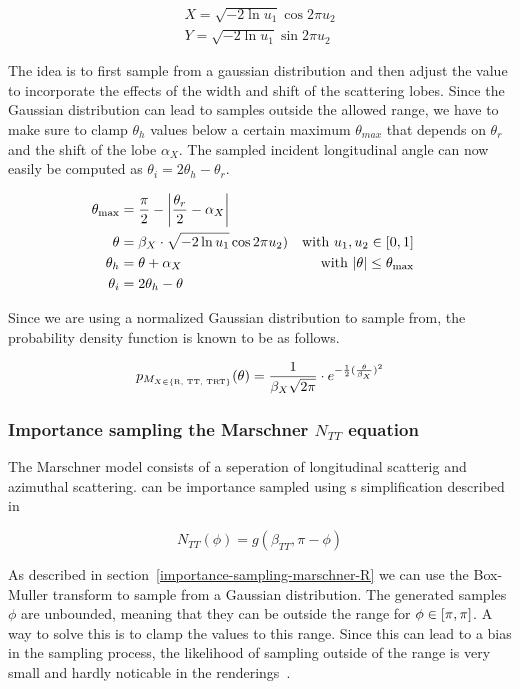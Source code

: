 \documentclass[12pt,a4paper,twoside]{article}
\begin{document}
\begin{eqnarray}
X = \sqrt{-2 \ln u_1} \cos 2\pi u_2 \\
Y = \sqrt{-2 \ln u_1} \sin 2\pi u_2 
\end{eqnarray}

The idea is to first sample from a gaussian distribution and then adjust the value to incorporate the effects of the width and shift of the scattering lobes. Since the Gaussian distribution can lead to samples outside the allowed range, we have to make sure to clamp $\theta_h$ values below a certain maximum $\theta_{max}$ that depends on $\theta_r$ and the shift of the lobe $\alpha_X$. The sampled incident longitudinal angle can now easily be computed as $\theta_i = 2\theta_h - \theta_r$.

\begin{align}
\theta_{\textnormal{max}} & = \frac{\pi}{2} - \left| \frac{\theta_r}{2} - \alpha_X\right| \\
\theta & = \beta_{X} \cdot \sqrt{-2 \ln u_1} \cos 2\pi u_2) & \textnormal{with $u_1, u_2 \in [0, 1]$}  \\
\theta_h & = \theta + \alpha_X & \textnormal{with $\left|\theta\right| \leq \theta_{\textnormal{max}}$}\\
\theta_i & = 2 \theta_h - \theta &&
\end{align}

Since we are using a normalized Gaussian distribution to sample from, the probability density function is known to be as follows.

\begin{equation}
p_{M_{X \in \{\textnormal{R, TT, TRT}\}}}(\theta) = \frac{1}{\beta_{X} \sqrt{2\pi}} \cdot e^{-\frac{1}{2}(\frac{\theta}{\beta_{X}})^2}
\end{equation}


\subsubsection*{Importance sampling the Marschner $N_{TT}$ equation}

The Marschner model consists of a seperation of longitudinal scatterig and azimuthal scattering. can be importance sampled using s simplification described in~\cite{sadeghi:10} 

\begin{equation}
N_{TT}(\phi) = g(\beta_{TT}, \pi - \phi)
\end{equation}


As described in section~\ref{importance-sampling-marschner-R} we can use the Box-Muller transform to sample from a Gaussian distribution. 
The generated samples $\phi$ are unbounded, meaning that they can be outside the range for $\phi \in [\-\pi, \pi]$. A way to solve this is to clamp the values to this range. Since this can lead to a bias in the sampling process, the likelihood of sampling outside of the range is very small and hardly noticable in the renderings~\cite{pixarmemo}.
\end{document}

